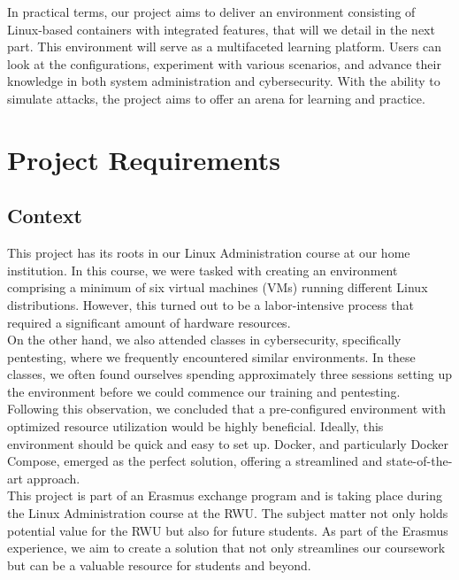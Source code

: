 \documentclass[a4paper,11pt,singlespacing]{article}
\begin{document}
In practical terms, our project aims to deliver an environment consisting of Linux-based containers with integrated features, that will we detail in the next part. This environment will serve as a multifaceted learning platform. Users can look at the configurations, experiment with various scenarios, and advance their knowledge in both system administration and cybersecurity. With the ability to simulate attacks, the project aims to offer an arena for learning and practice.


\section{Project Requirements}\label{ProjectRequirements}

\subsection{Context}
This project has its roots in our Linux Administration course at our home institution. In this course, we were tasked with creating an environment comprising a minimum of six virtual machines (VMs) running different Linux distributions. However, this turned out to be a labor-intensive process that required a significant amount of hardware resources.\\

On the other hand, we also attended classes in cybersecurity, specifically pentesting, where we frequently encountered similar environments. In these classes, we often found ourselves spending approximately three sessions setting up the environment before we could commence our training and pentesting.\\

Following this observation, we concluded that a pre-configured environment with optimized resource utilization would be highly beneficial. Ideally, this environment should be quick and easy to set up. Docker, and particularly Docker Compose, emerged as the perfect solution, offering a streamlined and state-of-the-art approach.\\

This project is part of an Erasmus exchange program and is taking place during the Linux Administration course at the RWU. The subject matter not only holds potential value for the RWU but also for future students. As part of the Erasmus experience, we aim to create a solution that not only streamlines our coursework but can be a valuable resource for students and beyond.\par
\end{document}
